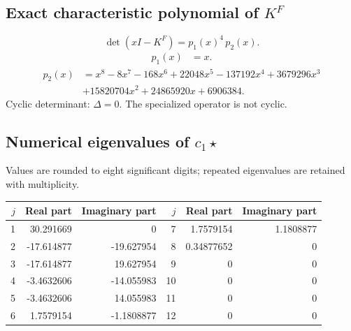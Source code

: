 \documentclass[10pt,a4paper]{article}
\begin{document}
\subsection*{Exact characteristic polynomial of $K^F$}
\[\det(xI-K^F)=p_{1}(x)^{4}\,p_{2}(x).\]
\[\begin{aligned}p_{1}(x)&=x.\end{aligned}\]
\[\begin{aligned}p_{2}(x)&=x^{8} - 8 x^{7} - 168 x^{6} + 22048 x^{5} - 137192 x^{4} + 3679296 x^{3}\\&+15820704 x^{2} + 24865920 x + 6906384.\end{aligned}\]
Cyclic determinant: $\Delta=0$. The specialized operator is not cyclic.
\subsection*{Numerical eigenvalues of $c_1\star$}
Values are rounded to eight significant digits; repeated eigenvalues are retained with multiplicity.
\begin{center}\small\begin{tabular}{rrr@{\qquad}rrr}\toprule $j$ & Real part & Imaginary part & $j$ & Real part & Imaginary part\\\midrule
1 & 30.291669 & 0 & 7 & 1.7579154 & 1.1808877\\
2 & -17.614877 & -19.627954 & 8 & 0.34877652 & 0\\
3 & -17.614877 & 19.627954 & 9 & 0 & 0\\
4 & -3.4632606 & -14.055983 & 10 & 0 & 0\\
5 & -3.4632606 & 14.055983 & 11 & 0 & 0\\
6 & 1.7579154 & -1.1808877 & 12 & 0 & 0\\
\bottomrule\end{tabular}\end{center}
\end{document}
